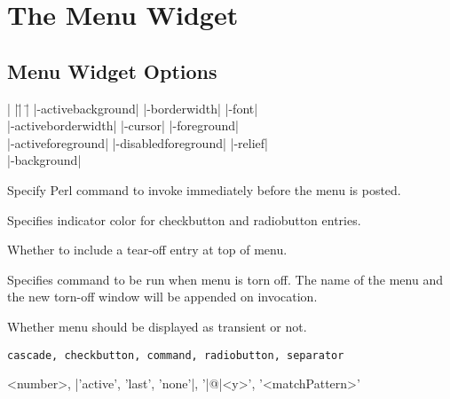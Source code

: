 
\section{The Menu Widget}

\subsection*{Menu Widget Options}
\begin{tabbing}
|                   |\=|                     |\= \kill
|-activebackground|  \> |-borderwidth|        \> |-font| \\
|-activeborderwidth| \> |-cursor|             \> |-foreground| \\
|-activeforeground|  \> |-disabledforeground| \> |-relief| \\
|-background| 	\\
\end{tabbing}

\vskip5pt
\begin{enum}{1cm}

Specify Perl command to invoke immediately before the menu is posted.

Specifies indicator color for checkbutton and radiobutton entries.

Whether to include a tear-off entry at top of menu.

Specifies command to be run when menu is torn off. The name of the
menu and the new torn-off window will be appended on invocation.

Whether menu should be displayed as transient or not.

\end{enum}
\begin{enum}{2.5cm}

 {\tt cascade, checkbutton, command, radiobutton, separator}

 <number>, |'active', 'last', 'none'|, '|@|<y>', '<matchPattern>'

\end{enum}


